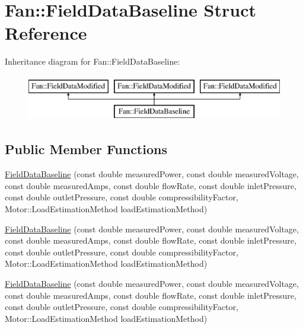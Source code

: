 \hypertarget{struct_fan_1_1_field_data_baseline}{}\section{Fan\+:\+:Field\+Data\+Baseline Struct Reference}
\label{struct_fan_1_1_field_data_baseline}
Inheritance diagram for Fan\+:\+:Field\+Data\+Baseline\+:\begin{figure}[H]
\begin{center}
\leavevmode
\includegraphics[height=2.000000cm]{d1/d33/struct_fan_1_1_field_data_baseline}
\end{center}
\end{figure}
\subsection*{Public Member Functions}
\begin{DoxyCompactItemize}
\item 
\hyperlink{struct_fan_1_1_field_data_baseline_a99f4a04d6960b3fe664b991581da87d3}{Field\+Data\+Baseline} (const double measured\+Power, const double measured\+Voltage, const double measured\+Amps, const double flow\+Rate, const double inlet\+Pressure, const double outlet\+Pressure, const double compressibility\+Factor, Motor\+::\+Load\+Estimation\+Method load\+Estimation\+Method)
\item 
\hyperlink{struct_fan_1_1_field_data_baseline_a99f4a04d6960b3fe664b991581da87d3}{Field\+Data\+Baseline} (const double measured\+Power, const double measured\+Voltage, const double measured\+Amps, const double flow\+Rate, const double inlet\+Pressure, const double outlet\+Pressure, const double compressibility\+Factor, Motor\+::\+Load\+Estimation\+Method load\+Estimation\+Method)
\item 
\hyperlink{struct_fan_1_1_field_data_baseline_a99f4a04d6960b3fe664b991581da87d3}{Field\+Data\+Baseline} (const double measured\+Power, const double measured\+Voltage, const double measured\+Amps, const double flow\+Rate, const double inlet\+Pressure, const double outlet\+Pressure, const double compressibility\+Factor, Motor\+::\+Load\+Estimation\+Method load\+Estimation\+Method)
\end{DoxyCompactItemize}
